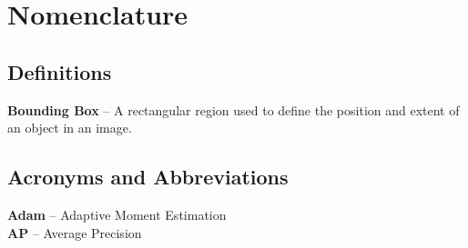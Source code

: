 \chapter*{Nomenclature}
\section*{Definitions}

\textbf{Bounding Box} – A rectangular region used to define the position and extent of an object in an image. \\

\section*{Acronyms and Abbreviations}

\textbf{Adam} – Adaptive Moment Estimation \\
\textbf{AP} – Average Precision \\